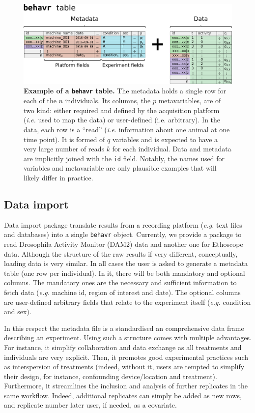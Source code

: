 \documentclass[10pt,letterpaper]{article}
\begin{document}
     
\begin{figure}[!h]
	\includegraphics[width=1\textwidth]{fig/behavr.pdf}
	\caption{{\bf Example of a \texttt{behavr} table.}
		The metadata holds a single row for each of the $n$ individuals. 
		Its columns, the $p$ metavariables, are of two kind: either required and defined by the acquisition platform (\emph{i.e.} used to map the data) or user-defined (i.e. arbitrary).
		In the data, each row is a ``read'' (\emph{i.e.} information about one animal at one time point).
		It is formed of $q$ variables and is expected to have a very large number of reads $k$ for each individual.
		Data and metadata are implicitly joined with the \texttt{id} field.
		Notably, the names used for variables and metavariable are only plausible examples that will likely differ in practice. 
	}
	\label{fig:behavr}
\end{figure}


\subsection*{Data import}
Data import package translate results from a recording platform (\emph{e.g.} text files and databases) into a single \texttt{behavr} object.
Currently, we provide a package to read Drosophila Activity Monitor (DAM2) data  and another one for Ethoscope data.
Although the structure of the raw results if very different, conceptually, loading data is very similar.
In all cases the user is asked to generate a metadata table (one row per individual). 
In it, there will be both mandatory and optional columns.
The mandatory ones are the necessary and sufficient information to fetch data (\emph{e.g.} machine id, region of interest and date). 
The optional columns are user-defined arbitrary fields that relate to the experiment itself (\emph{e.g.} condition and sex).

In this respect the metadata file is a standardised an comprehensive data frame describing an experiment.
Using such a structure comes with multiple advantages.
For instance, it simplify collaboration and data exchange as all treatments and individuals are very explicit.
Then, it promotes good experimental practices such as interspersion of treatments (indeed, without it, users are tempted to simplify their design, for instance, confounding device/location and treatment).
Furthermore, it streamlines the inclusion and analysis of further replicates in the same workflow. Indeed, additional replicates can simply be added as new rows, and replicate number later user, if needed, as a covariate.	
\end{document}
